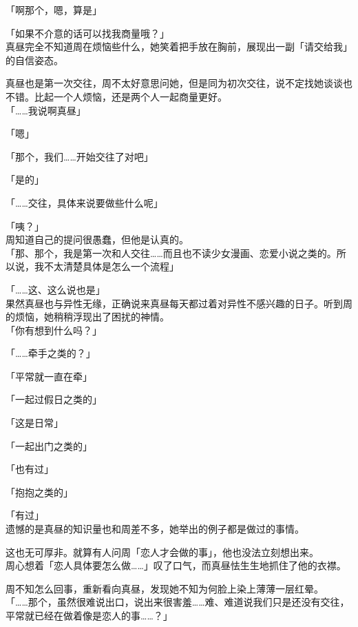 「啊那个，嗯，算是」

「如果不介意的话可以找我商量哦？」\\

真昼完全不知道周在烦恼些什么，她笑着把手放在胸前，展现出一副「请交给我」的自信姿态。

真昼也是第一次交往，周不太好意思问她，但是同为初次交往，说不定找她谈谈也不错。比起一个人烦恼，还是两个人一起商量更好。\\

「……我说啊真昼」

「嗯」

「那个，我们……开始交往了对吧」

「是的」

「……交往，具体来说要做些什么呢」

「咦？」\\

周知道自己的提问很愚蠢，但他是认真的。\\

「那、那个，我是第一次和人交往……而且也不读少女漫画、恋爱小说之类的。所以说，我不太清楚具体是怎么一个流程」

「……这、这么说也是」\\

果然真昼也与异性无缘，正确说来真昼每天都过着对异性不感兴趣的日子。听到周的烦恼，她稍稍浮现出了困扰的神情。\\

「你有想到什么吗？」

「……牵手之类的？」

「平常就一直在牵」

「一起过假日之类的」

「这是日常」

「一起出门之类的」

「也有过」

「抱抱之类的」

「有过」\\

遗憾的是真昼的知识量也和周差不多，她举出的例子都是做过的事情。

这也无可厚非。就算有人问周「恋人才会做的事」，他也没法立刻想出来。\\

周心想着「恋人具体要怎么做……」叹了口气，而真昼怯生生地抓住了他的衣襟。

周不知怎么回事，重新看向真昼，发现她不知为何脸上染上薄薄一层红晕。\\

「……那个，虽然很难说出口，说出来很害羞……难、难道说我们只是还没有交往，平常就已经在做着像是恋人的事……？」\\

